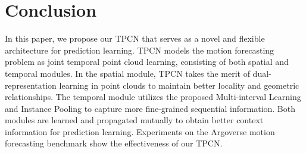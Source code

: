 \documentclass[final]{cvpr}
\begin{document}
\section{Conclusion}
    \vspace{-5pt}
    In this paper, we propose our TPCN that serves as a novel and flexible architecture for prediction learning. TPCN models the motion forecasting problem as joint temporal point cloud learning, consisting of both spatial and temporal modules. In the spatial module, TPCN takes the merit of dual-representation learning in point clouds to maintain better locality and geometric relationships. The temporal module utilizes the proposed Multi-interval Learning and Instance Pooling to capture more fine-grained sequential information. Both modules are learned and propagated mutually to obtain better context information for prediction learning. Experiments on the Argoverse motion forecasting benchmark show the effectiveness of our TPCN.
\end{document}

